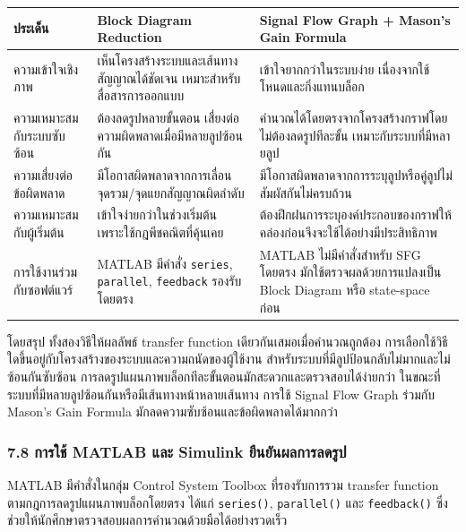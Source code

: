 \begin{table}[htbp]
    \centering
    \small
    \begin{tabularx}{\textwidth}{L{0.18\textwidth} Y Y}
        \hline
        \textbf{ประเด็น} & \textbf{Block Diagram Reduction} & \textbf{Signal Flow Graph + Mason's Gain Formula} \\
        \hline
        ความเข้าใจเชิงภาพ & เห็นโครงสร้างระบบและเส้นทางสัญญาณได้ชัดเจน เหมาะสำหรับสื่อสารการออกแบบ & เข้าใจยากกว่าในระบบง่าย เนื่องจากใช้โหนดและกิ่งแทนบล็อก \\
        ความเหมาะสมกับระบบซับซ้อน & ต้องลดรูปหลายขั้นตอน เสี่ยงต่อความผิดพลาดเมื่อมีหลายลูปซ้อนกัน & คำนวณได้โดยตรงจากโครงสร้างกราฟโดยไม่ต้องลดรูปทีละขั้น เหมาะกับระบบที่มีหลายลูป \\
        ความเสี่ยงต่อข้อผิดพลาด & มีโอกาสผิดพลาดจากการเลื่อนจุดรวม/จุดแยกสัญญาณผิดลำดับ & มีโอกาสผิดพลาดจากการระบุลูปหรือคู่ลูปไม่สัมผัสกันไม่ครบถ้วน \\
        ความเหมาะสมกับผู้เริ่มต้น & เข้าใจง่ายกว่าในช่วงเริ่มต้น เพราะใช้กฎพีชคณิตที่คุ้นเคย & ต้องฝึกฝนการระบุองค์ประกอบของกราฟให้คล่องก่อนจึงจะใช้ได้อย่างมีประสิทธิภาพ \\
        การใช้งานร่วมกับซอฟต์แวร์ & MATLAB มีคำสั่ง \texttt{series}, \texttt{parallel}, \texttt{feedback} รองรับโดยตรง & MATLAB ไม่มีคำสั่งสำหรับ SFG โดยตรง มักใช้ตรวจผลด้วยการแปลงเป็น Block Diagram หรือ state-space ก่อน \\
        \hline
    \end{tabularx}
\end{table}

โดยสรุป ทั้งสองวิธีให้ผลลัพธ์ transfer function เดียวกันเสมอเมื่อคำนวณถูกต้อง การเลือกใช้วิธีใดขึ้นอยู่กับโครงสร้างของระบบและความถนัดของผู้ใช้งาน สำหรับระบบที่มีลูปป้อนกลับไม่มากและไม่ซ้อนกันซับซ้อน การลดรูปแผนภาพบล็อกทีละขั้นตอนมักสะดวกและตรวจสอบได้ง่ายกว่า ในขณะที่ระบบที่มีหลายลูปซ้อนกันหรือมีเส้นทางหน้าหลายเส้นทาง การใช้ Signal Flow Graph ร่วมกับ Mason's Gain Formula มักลดความซับซ้อนและข้อผิดพลาดได้มากกว่า


\subsubsection{7.8 การใช้ MATLAB และ Simulink ยืนยันผลการลดรูป}

MATLAB มีคำสั่งในกลุ่ม Control System Toolbox ที่รองรับการรวม transfer function ตามกฎการลดรูปแผนภาพบล็อกโดยตรง ได้แก่ \texttt{series()}, \texttt{parallel()} และ \texttt{feedback()} ซึ่งช่วยให้นักศึกษาตรวจสอบผลการคำนวณด้วยมือได้อย่างรวดเร็ว

